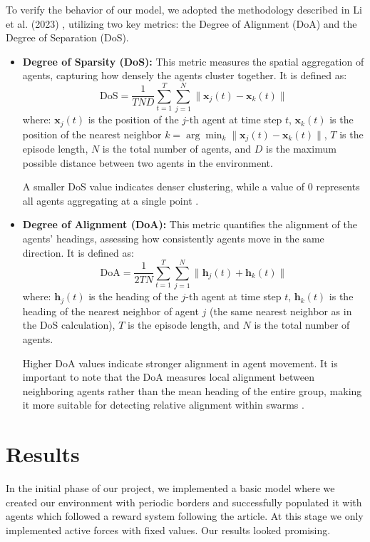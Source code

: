 \documentclass[9pt]{pnas-new}
\begin{document}
	To verify the behavior of our model, we adopted the methodology described in Li et al. (2023) \cite{li2023predator}, utilizing two key metrics: the Degree of Alignment (DoA) and the Degree of Separation (DoS).
	
	\begin{itemize}
		\item \textbf{Degree of Sparsity (DoS):} This metric measures the spatial aggregation of agents, capturing how densely the agents cluster together. It is defined as:
		\[
		\text{DoS} = \frac{1}{TND} \sum_{t=1}^T \sum_{j=1}^N \| \mathbf{x}_j(t) - \mathbf{x}_k(t) \|
		\]
		where: \( \mathbf{x}_j(t) \) is the position of the \(j\)-th agent at time step \(t\), \( \mathbf{x}_k(t) \) is the position of the nearest neighbor \(k = \arg\min_k \| \mathbf{x}_j(t) - \mathbf{x}_k(t) \| \), \(T\) is the episode length, \(N\) is the total number of agents, and \(D\) is the maximum possible distance between two agents in the environment.
		
		A smaller DoS value indicates denser clustering, while a value of 0 represents all agents aggregating at a single point \cite{li2023predator}. 
		
		\item \textbf{Degree of Alignment (DoA):} This metric quantifies the alignment of the agents' headings, assessing how consistently agents move in the same direction. It is defined as:
		\[
		\text{DoA} = \frac{1}{2TN} \sum_{t=1}^T \sum_{j=1}^N \| \mathbf{h}_j(t) + \mathbf{h}_k(t) \|
		\]
		where: \( \mathbf{h}_j(t) \) is the heading of the \(j\)-th agent at time step \(t\), \( \mathbf{h}_k(t) \) is the heading of the nearest neighbor of agent \(j\) (the same nearest neighbor as in the DoS calculation), \(T\) is the episode length, and \(N\) is the total number of agents.
		
		Higher DoA values indicate stronger alignment in agent movement. It is important to note that the DoA measures local alignment between neighboring agents rather than the mean heading of the entire group, making it more suitable for detecting relative alignment within swarms \cite{li2023predator}.
	\end{itemize}
	
	\section*{Results}
	
	
	In the initial phase of our project, we implemented a basic model where we created our environment with periodic borders and successfully populated it with agents which followed a reward system following the article. At this stage we only implemented active forces with fixed values. Our results looked promising.
	
\end{document}
